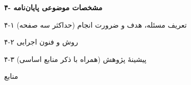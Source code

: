 \documentclass[a4paper,12pt]{article}
\begin{document}
	\newpage
	
	\vspace{0.5cm}%
	{\centering\large\textbf{۴- مشخصات موضوعی پایان‌نامه}\par}%
	\vspace{0.5cm}%
	
	\begingroup
	\setlength{\leftskip}{-0.5cm}
	\setlength{\rightskip}{-0.5cm}
	\begin{contentbox}[halign title=flush right]
		{۴-۱ تعریف مسئله، هدف و ضرورت انجام (حداکثر سه صفحه)}
		
	\end{contentbox}
	\endgroup
	
	
	
	\newpage
	
	\begingroup
	\setlength{\leftskip}{-0.5cm}
	\setlength{\rightskip}{-0.5cm}
	\begin{contentbox}
		{۴-۲ روش و فنون اجرایی}
		
		\vspace*{5.5cm}
	\end{contentbox}
	\endgroup
	
	\vspace{0.9cm}
	
	
	
	\newpage
	
	\begingroup
	\setlength{\leftskip}{-0.5cm}
	\setlength{\rightskip}{-0.5cm}
	\begin{contentbox}
		{۴-۳ پیشینهٔ پژوهش (همراه با ذکر منابع اساسی)}
		\setcounter{subsection}{0}
		\vspace*{5.5cm}
	\end{contentbox}
	\endgroup
	
	\vspace{0.9cm}
	
	
	
	\newpage
	
	\begingroup
	\setlength{\leftskip}{-0.5cm}
	\setlength{\rightskip}{-0.5cm}
	\begin{contentbox}
		{منابع}
		\renewcommand{\refname}{}
		
		\lr{}
	\end{contentbox}
	\endgroup
	
\end{document}
